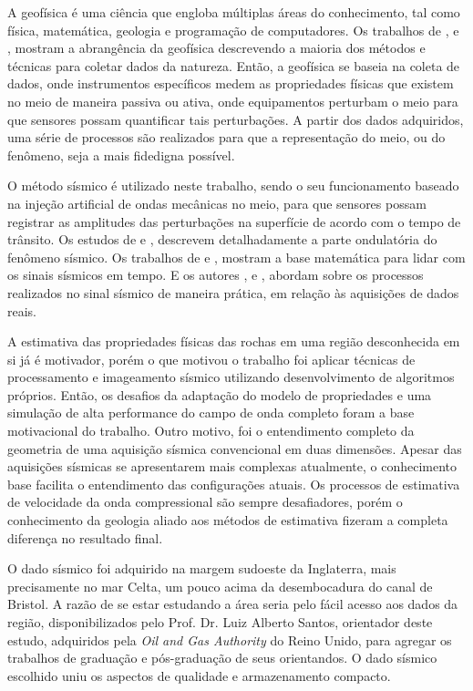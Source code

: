 \documentclass[
	12pt,				%
	openright,			%
	oneside,			%
	a4paper,			%
	english,			%
	brazil				%
	]{abntex2}
\begin{document}
	A geofísica é uma ciência que engloba múltiplas áreas do conhecimento, tal como física, matemática, geologia e programação de computadores. Os trabalhos de ,  e , mostram a abrangência da geofísica descrevendo a maioria dos métodos e técnicas para coletar dados da natureza. Então, a geofísica se baseia na coleta de dados, onde instrumentos específicos medem as propriedades físicas que existem no meio de maneira passiva ou ativa, onde equipamentos perturbam o meio para que sensores possam quantificar tais perturbações. A partir dos dados adquiridos, uma série de processos são realizados para que a representação do meio, ou do fenômeno, seja a mais fidedigna possível.      

	O método sísmico é utilizado neste trabalho, sendo o seu funcionamento baseado na injeção artificial de ondas mecânicas no meio, para que sensores possam registrar as amplitudes das perturbações na superfície de acordo com o tempo de trânsito. Os estudos de  e , descrevem detalhadamente a parte ondulatória do fenômeno sísmico. Os trabalhos de  e , mostram a base matemática para lidar com os sinais sísmicos em tempo. E os autores ,  e , abordam sobre os processos realizados no sinal sísmico de maneira prática, em relação às aquisições de dados reais.
	
	A estimativa das propriedades físicas das rochas em uma região desconhecida em si já é motivador, porém o que motivou o trabalho foi aplicar técnicas de processamento e imageamento sísmico utilizando desenvolvimento de algoritmos próprios. Então, os desafios da adaptação do modelo de propriedades e uma simulação de alta performance do campo de onda completo foram a base motivacional do trabalho. Outro motivo, foi o entendimento completo da geometria de uma aquisição sísmica convencional em duas dimensões. Apesar das aquisições sísmicas se apresentarem mais complexas atualmente, o conhecimento base facilita o entendimento das configurações atuais. Os processos de estimativa de velocidade da onda compressional são sempre desafiadores, porém o conhecimento da geologia aliado aos métodos de estimativa fizeram a completa diferença no resultado final.      
	   
	O dado sísmico foi adquirido na margem sudoeste da Inglaterra, mais precisamente no mar Celta, um pouco acima da desembocadura do canal de Bristol. A razão de se estar estudando a área seria pelo fácil acesso aos dados da região, disponibilizados pelo Prof. Dr. Luiz Alberto Santos, orientador deste estudo, adquiridos pela \textit{Oil and Gas Authority} do Reino Unido, para agregar os trabalhos de graduação e pós-graduação de seus orientandos. O dado sísmico escolhido uniu os aspectos de qualidade e armazenamento compacto.    
	
\end{document}
